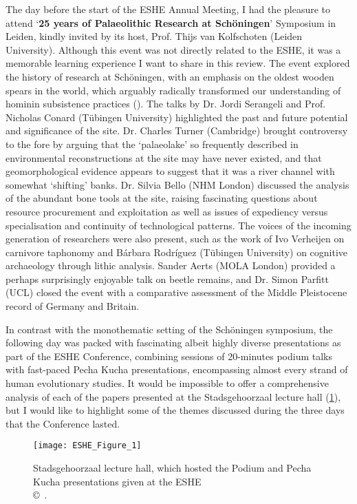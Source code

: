 The day before the start of the ESHE Annual Meeting, I had the pleasure to attend ‘\textbf{25 years of Palaeolithic Research at Schöningen}’ Symposium in Leiden, kindly invited by its host, Prof. Thijs van Kolfschoten (Leiden University). Although this event was not directly related to the ESHE, it was a memorable learning experience I want to share in this review. The event explored the history of research at Schöningen, with an emphasis on the oldest wooden spears in the world, which arguably radically transformed our understanding of hominin subsistence practices (\cite[][]{thieme}).
The talks by Dr. Jordi Serangeli and Prof. Nicholas Conard (Tübingen University) highlighted the past and future potential and significance of the site. Dr. Charles Turner (Cambridge) brought controversy to the fore by arguing that the ‘palaeolake’ so frequently described in environmental reconstructions at the site may have never existed, and that geomorphological evidence appears to suggest that it was a river channel with somewhat ‘shifting’ banks. Dr. Silvia Bello (NHM London) discussed the analysis of the abundant bone tools at the site, raising fascinating questions about resource procurement and exploitation as well as issues of expediency versus specialisation and continuity of technological patterns. The voices of the incoming generation of researchers were also present, such as the work of Ivo Verheijen on carnivore taphonomy and Bárbara Rodríguez (Tübingen University) on cognitive archaeology through lithic analysis. Sander Aerts (MOLA London) provided a perhaps surprisingly enjoyable talk on beetle remains, and Dr. Simon Parfitt (UCL) closed the event with a comparative assessment of the Middle Pleistocene record of Germany and Britain.

In contrast with the monothematic setting of the Schöningen symposium, the following day was packed with fascinating albeit highly diverse presentations as part of the ESHE Conference, combining sessions of 20-minutes podium talks with fast-paced Pecha Kucha presentations, encompassing almost every strand of human evolutionary studies. It would be impossible to offer a comprehensive analysis of each of the papers presented at the Stadsgehoorzaal lecture hall (\cref{fig:ESHE_Figure_1}), but I would like to highlight some of the themes discussed during the three days that the Conference lasted.

\begin{figure}[!htb]
	\texttt{[image: ESHE\_Figure\_1]}
	\caption{Stadsgehoorzaal lecture hall, which hosted the Podium and Pecha Kucha presentations given at the ESHE
		{\normalfont\scriptsize \\ \copyright\
			\shortauthor.
	}}
	\label{fig:ESHE_Figure_1}
\end{figure}

